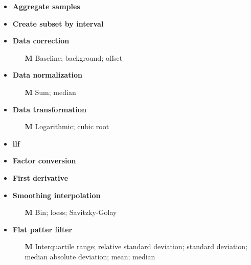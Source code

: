 \begin{multicols}{2}
	\begin{itemize}
		\item \textbf{Aggregate samples}
		\item \textbf{Create subset by interval}	
		\item \textbf{Data correction}
		\begin{itemize}
			\item[\textbf{M}] Baseline; background; offset
		\end{itemize}
		\item \textbf{Data normalization}
		\begin{itemize}
			\item[\textbf{M}] Sum; median
		\end{itemize}
		\item \textbf{Data transformation}
		\begin{itemize}
			\item[\textbf{M}] Logarithmic; cubic root
		\end{itemize}
		\item \textbf{\acrlong{llf}}
		\item \textbf{Factor conversion}
		\item \textbf{First derivative}
		\item \textbf{Smoothing interpolation}
		\begin{itemize}
			\item[\textbf{M}] Bin; loess; Savitzky-Golay
		\end{itemize}
		\item \textbf{Flat patter filter}
		\begin{itemize}
			\item[\textbf{M}] Interquartile range; relative standard deviation; standard deviation; median absolute deviation; mean; median

\end{itemize}
\end{itemize}
\end{multicols}
